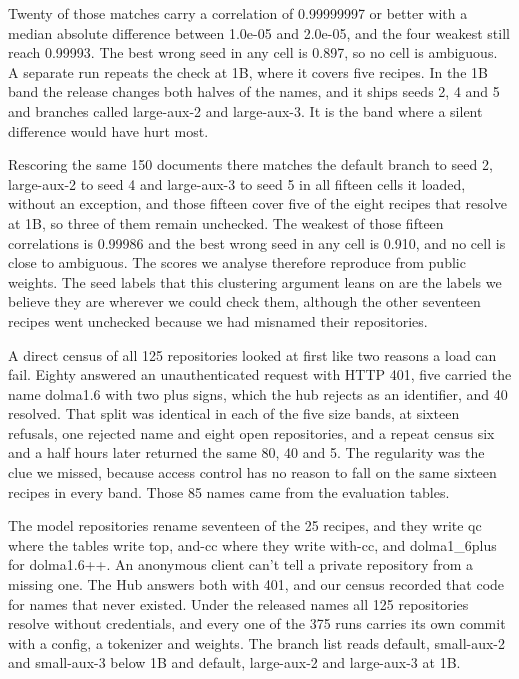 Twenty of those matches carry a correlation of 0.99999997 or better with a median absolute difference between 1.0e-05 and 2.0e-05, and the four weakest still reach 0.99993. The best wrong seed in any cell is 0.897, so no cell is ambiguous. A separate run repeats the check at 1B, where it covers five recipes. In the 1B band the release changes both halves of the names, and it ships seeds 2, 4 and 5 and branches called large-aux-2 and large-aux-3. It is the band where a silent difference would have hurt most.

Rescoring the same 150 documents there matches the default branch to seed 2, large-aux-2 to seed 4 and large-aux-3 to seed 5 in all fifteen cells it loaded, without an exception, and those fifteen cover five of the eight recipes that resolve at 1B, so three of them remain unchecked. The weakest of those fifteen correlations is 0.99986 and the best wrong seed in any cell is 0.910, and no cell is close to ambiguous. The scores we analyse therefore reproduce from public weights. The seed labels that this clustering argument leans on are the labels we believe they are wherever we could check them, although the other seventeen recipes went unchecked because we had misnamed their repositories.

A direct census of all 125 repositories looked at first like two reasons a load can fail. Eighty answered an unauthenticated request with HTTP 401, five carried the name dolma1.6 with two plus signs, which the hub rejects as an identifier, and 40 resolved. That split was identical in each of the five size bands, at sixteen refusals, one rejected name and eight open repositories, and a repeat census six and a half hours later returned the same 80, 40 and 5. The regularity was the clue we missed, because access control has no reason to fall on the same sixteen recipes in every band. Those 85 names came from the evaluation tables.

The model repositories rename seventeen of the 25 recipes, and they write qc where the tables write top, and-cc where they write with-cc, and dolma1\_6plus for dolma1.6++. An anonymous client can't tell a private repository from a missing one. The Hub answers both with 401, and our census recorded that code for names that never existed. Under the released names all 125 repositories resolve without credentials, and every one of the 375 runs carries its own commit with a config, a tokenizer and weights. The branch list reads default, small-aux-2 and small-aux-3 below 1B and default, large-aux-2 and large-aux-3 at 1B.

